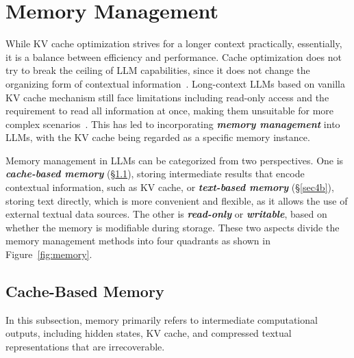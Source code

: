 \section{Memory Management}\label{sec4}

While KV cache optimization strives for a longer context practically, essentially, it is a balance between efficiency and performance. Cache optimization does not try to break the ceiling of LLM capabilities, since it does not change the organizing form of contextual information~\citep{fu2024challenges,luohekeep}. Long-context LLMs based on vanilla KV cache mechanism still face limitations including read-only access and the requirement to read all information at once, making them unsuitable for more complex scenarios~\citep{dai2019transformer, bulatov2022recurrent}. This has led to incorporating \textbf{\textit{memory management}} into LLMs, with the KV cache being regarded as a specific memory instance.

Memory management in LLMs can be categorized from two perspectives. One is \textbf{\textit{cache-based memory}} (\S\ref{sec4a}), storing intermediate results that encode contextual information, such as KV cache, or \textbf{\textit{text-based memory}} (\S\ref{sec4b}), storing text directly, which is more convenient and flexible, as it allows the use of external textual data sources. The other is \textbf{\textit{read-only}} or \textbf{\textit{writable}}, based on whether the memory is modifiable during storage. These two aspects divide the memory management methods into four quadrants as shown in Figure~\ref{fig:memory}.




\subsection{Cache-Based Memory}\label{sec4a}

In this subsection, memory primarily refers to intermediate computational outputs, including hidden states, KV cache, and compressed textual representations that are irrecoverable.
